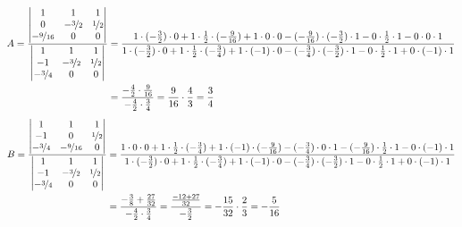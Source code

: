 \documentclass[11pt,a4paper,DIV=12]{scrartcl}
\begin{document}
\begin{align}A=\frac{\begin{vmatrix}
			1 & 1 & 1 \\
			0 & -\nicefrac{3}{2} & \nicefrac{1}{2} \\
			-\nicefrac{9}{16} &0& 0
	\end{vmatrix}}{\begin{vmatrix}
			1 & 1 & 1 \\
			-1 & -\nicefrac{3}{2} & \nicefrac{1}{2} \\
			-\nicefrac{3}{4} & 0 & 0
	\end{vmatrix}}&=\frac{1\cdot (-\frac{3}{2})\cdot 0 + 1\cdot \frac{1}{2} \cdot(-\frac{9}{16}) +1\cdot 0 \cdot 0- (-\frac{9}{16})\cdot (-\frac{3}{2})\cdot 1-0\cdot \frac{1}{2}\cdot 1 - 0 \cdot 0 \cdot 1}{1\cdot (-\frac{3}{2})\cdot 0 +1\cdot \frac{1}{2}\cdot (-\frac{3}{4})+1\cdot (-1) \cdot 0- (-\frac{3}{4})\cdot (-\frac{3}{2})\cdot 1 -0\cdot \frac{1}{2}\cdot 1 + 0\cdot (-1) \cdot 1}\nonumber \\
	&=\frac{-\frac{4}{2}\cdot\frac{9}{16}}{-\frac{4}{2}\cdot\frac{3}{4}}=\frac{9}{16}\cdot\frac{4}{3}=\frac{3}{4}
\end{align}
\begin{align}
	B=\frac{\begin{vmatrix}
			1 & 1 & 1 \\
			-1 & 0 & \nicefrac{1}{2} \\
			-\nicefrac{3}{4} & -\nicefrac{9}{16}&0
	\end{vmatrix}}{\begin{vmatrix}
			1 & 1 & 1 \\
			-1 & -\nicefrac{3}{2} & \nicefrac{1}{2} \\
			-\nicefrac{3}{4} & 0 & 0
	\end{vmatrix}}&=\frac{1\cdot 0 \cdot 0+ 1 \cdot \frac{1}{2}\cdot (-\frac{3}{4})+1\cdot (-1)\cdot (-\frac{9}{16})-(-\frac{3}{4})\cdot 0 \cdot 1 -(-\frac{9}{16})\cdot \frac{1}{2}\cdot 1 - 0\cdot (-1)\cdot 1}{1\cdot (-\frac{3}{2})\cdot 0 +1\cdot \frac{1}{2}\cdot (-\frac{3}{4})+1\cdot (-1) \cdot 0- (-\frac{3}{4})\cdot (-\frac{3}{2})\cdot 1 -0\cdot \frac{1}{2}\cdot 1 + 0\cdot (-1) \cdot 1}\nonumber \\
	&=\frac{-\frac{3}{8}+\frac{27}{32}}{-\frac{4}{2}\cdot\frac{3}{4}}=\frac{\frac{-12+27}{32}}{-\frac{3}{2}}=-\frac{15}{32}\cdot\frac{2}{3}=-\frac{5}{16}
\end{align}
\end{document}
